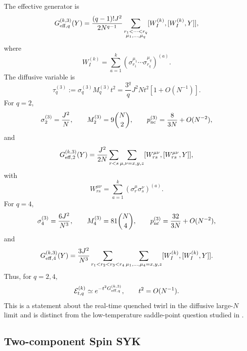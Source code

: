 \documentclass{article}
\theoremstyle{definition}
\begin{document}
The effective generator is
\begin{equation}
    G_{{\rm eff},q}^{(k,3)}(Y)
    =\frac{(q-1)!J^2}{2N^{q-1}}
    \sum_{\substack{r_1<\cdots<r_q\\
                    \mu_1,\ldots,\mu_q}}
    [W_I^{(k)},[W_I^{(k)},Y]],
\end{equation}
where
\begin{equation}
    W_I^{(k)}
    =\sum_{a=1}^k
    \left(
       \sigma_{r_1}^{\mu_1}\cdots\sigma_{r_q}^{\mu_q}
    \right)^{(a)}.
\end{equation}
The diffusive variable is
\begin{equation}
    \tau_q^{(3)}
    :=\sigma_q^{(3)}M_q^{(3)}t^2
    =\frac{3^q}{q}J^2Nt^2[1+O(N^{-1})].
\end{equation}
For $q=2$,
\begin{equation}
    \sigma_2^{(3)}=\frac{J^2}{N},
    \qquad
    M_2^{(3)}=9\binom N2,
    \qquad
    p_{\rm nc}^{(3)}=\frac{8}{3N}+O(N^{-2}),
\end{equation}
and
\begin{equation}
    G_{{\rm eff},2}^{(k,3)}(Y)
    =\frac{J^2}{2N}
    \sum_{r<s}\sum_{\mu,\nu=x,y,z}
    [W_{rs}^{\mu\nu},[W_{rs}^{\mu\nu},Y]],
\end{equation}
with
\begin{equation}
    W_{rs}^{\mu\nu}
    =\sum_{a=1}^k(\sigma_r^\mu\sigma_s^\nu)^{(a)}.
\end{equation}
For $q=4$,
\begin{equation}
    \sigma_4^{(3)}=\frac{6J^2}{N^3},
    \qquad
    M_4^{(3)}=81\binom N4,
    \qquad
    p_{\rm nc}^{(3)}=\frac{32}{3N}+O(N^{-2}),
\end{equation}
and
\begin{equation}
    G_{{\rm eff},4}^{(k,3)}(Y)
    =\frac{3J^2}{N^3}
    \sum_{r_1<r_2<r_3<r_4}
    \sum_{\mu_1,\ldots,\mu_4=x,y,z}
    [W_I^{(k)},[W_I^{(k)},Y]].
\end{equation}
Thus, for $q=2,4$,
\begin{equation}
    {\cal E}_{t,q}^{(k)}
    \simeq e^{-t^2G_{{\rm eff},q}^{(k,3)}},
    \qquad t^2=O(N^{-1}).
\end{equation}
This is a statement about the real-time quenched twirl in the diffusive
large-$N$ limit and is distinct from the low-temperature saddle-point
question studied in \cite{swingle2024bosonic}.

\subsection{Two-component Spin SYK}
\end{document}
